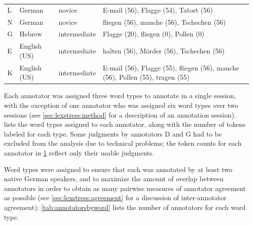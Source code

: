 \begin{table}[p]
\begin{tabularx}{\textwidth}{lllX}
		
		L & German	 & novice & E-mail (56), Flagge (54),  Tatort (56) \\
		

		
		N & German	& novice & fliegen (56),  manche (56), Tschechen (56)	 \\
		
		
		
		G & Hebrew	& intermediate & Flagge (20), 	fliegen (0),  Pollen (0)	 %
		\\		

		E & English (US)	& intermediate & 	halten (56),  M\"{o}rder (56), Tschechen (56) 	 \\

		K & English (US)	& intermediate &  E-mail (56), Flagge (55),	    fliegen (56),  manche (56),   Pollen (55),   tragen (55) \\		
		



		\bottomrule
		\end{tabularx}
		\label{tab:annotators}
	\end{table}
	
	
	
	
	Each annotator was assigned three word types to annotate in a single session, with the exception of one annotator who was assigned six word types over two sessions (see \cref{sec:lexstress:method} for a description of an annotation session).  lists the word types assigned to each annotator, along with the number of tokens labeled for each type. Some judgments by annotators D and G had to be excluded from the analysis due to technical problems; the token counts for each annotator in \cref{tab:annotators} reflect only their usable judgments. 
	
	Word types were assigned to ensure that each was annotated by at least two native German speakers, and to maximize the amount of overlap between annotators in order to obtain as many pairwise measures of annotator agreement as possible (see \cref{sec:lexstress:agreement} for a discussion of inter-annotator agreement); \cref{tab:annotatorsbyword} lists the number of annotators for each word type.
	
